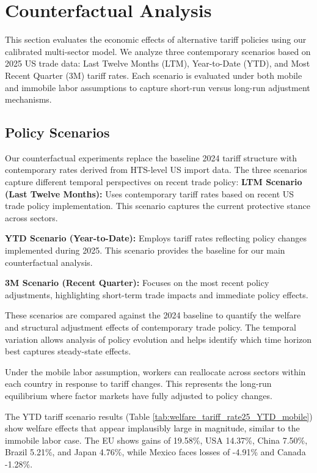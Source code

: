 \section{Counterfactual Analysis}

This section evaluates the economic effects of alternative tariff policies using our calibrated multi-sector model. We analyze three contemporary scenarios based on 2025 US trade data: Last Twelve Months (LTM), Year-to-Date (YTD), and Most Recent Quarter (3M) tariff rates. Each scenario is evaluated under both mobile and immobile labor assumptions to capture short-run versus long-run adjustment mechanisms.

\subsection{Policy Scenarios}

Our counterfactual experiments replace the baseline 2024 tariff structure with contemporary rates derived from HTS-level US import data. The three scenarios capture different temporal perspectives on recent trade policy:
\textbf{LTM Scenario (Last Twelve Months):} Uses contemporary tariff rates based on recent US trade policy implementation. This scenario captures the current protective stance across sectors.

\textbf{YTD Scenario (Year-to-Date):} Employs tariff rates reflecting policy changes implemented during 2025. This scenario provides the baseline for our main counterfactual analysis.

\textbf{3M Scenario (Recent Quarter):} Focuses on the most recent policy adjustments, highlighting short-term trade impacts and immediate policy effects.

These scenarios are compared against the 2024 baseline to quantify the welfare and structural adjustment effects of contemporary trade policy. The temporal variation allows analysis of policy evolution and helps identify which time horizon best captures steady-state effects.

Under the mobile labor assumption, workers can reallocate across sectors within each country in response to tariff changes. This represents the long-run equilibrium where factor markets have fully adjusted to policy changes.

The YTD tariff scenario results (Table \ref{tab:welfare_tariff_rate25_YTD_mobile}) show welfare effects that appear implausibly large in magnitude, similar to the immobile labor case. The EU shows gains of 19.58\%, USA 14.37\%, China 7.50\%, Brazil 5.21\%, and Japan 4.76\%, while Mexico faces losses of -4.91\% and Canada -1.28\%.

